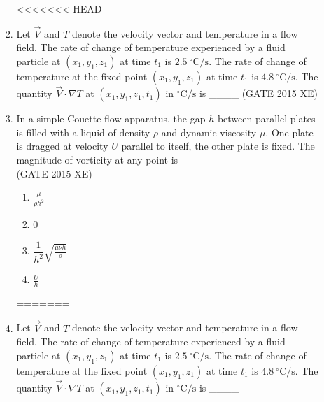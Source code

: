 \documentclass[journal,12pt,onecolumn]{IEEEtran}
\begin{document}
\begin{enumerate}
\begin{enumerate}
\begin{enumerate}[label=\arabic*)]
\begin{multicols}{4}
<<<<<<< HEAD
\end{multicols}

\newpage 

\item Let $\vec{V}$ and $T$ denote the velocity vector and temperature in a flow field. The rate of change of temperature experienced by a fluid particle at $(x_1, y_1, z_1)$ at time $t_1$ is $2.5 \ ^\circ\mathrm{C/s}$. The rate of change of temperature at the fixed point $(x_1, y_1, z_1)$ at time $t_1$ is $4.8 \ ^\circ\mathrm{C/s}$. The quantity $\vec{V} \cdot \nabla T$ at $(x_1, y_1, z_1, t_1)$ in $^\circ\mathrm{C/s}$ is \_\_\_\_
\hfill{(GATE 2015 XE)} \\



\item In a simple Couette flow apparatus, the gap $h$ between parallel plates is filled with a liquid of density $\rho$ and dynamic viscosity $\mu$. One plate is dragged at velocity $U$ parallel to itself, the other plate is fixed. The magnitude of vorticity at any point is  \\

\hfill{(GATE 2015 XE)} 
\begin{multicols}{4}
\begin{enumerate}
\item $\frac{\mu}{\rho h^2}$
\item $0$
\item $\dfrac{1}{h^2} \sqrt{\frac{\mu \nu h}{\rho}}$
\item $\frac{U}{h}$
\end{enumerate}
\end{multicols}
=======
\vspace{0.5cm}

\item Let $\vec{V}$ and $T$ denote the velocity vector and temperature in a flow field. The rate of change of temperature experienced by a fluid particle at $(x_1, y_1, z_1)$ at time $t_1$ is $2.5 \ ^\circ\mathrm{C/s}$. The rate of change of temperature at the fixed point $(x_1, y_1, z_1)$ at time $t_1$ is $4.8 \ ^\circ\mathrm{C/s}$. The quantity $\vec{V} \cdot \nabla T$ at $(x_1, y_1, z_1, t_1)$ in $^\circ\mathrm{C/s}$ is \_\_\_\_
\hfill{} \\


\end{enumerate}
\end{enumerate}
\end{enumerate}
\end{document}
